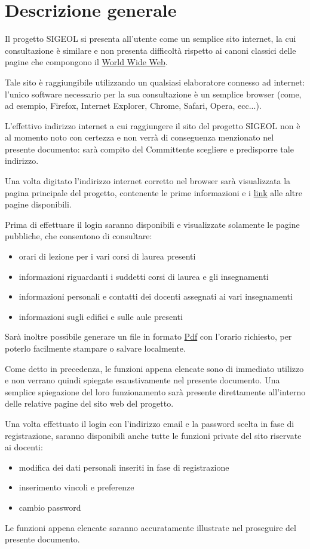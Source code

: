 \documentclass[11pt,a4paper]{article}
\begin{document}
\section{Descrizione generale}
Il progetto SIGEOL si presenta all'utente come un semplice sito internet, la cui consultazione è similare e non presenta difficoltà rispetto ai canoni classici delle pagine che compongono il \underline{World Wide Web}.

Tale sito è raggiungibile utilizzando un qualsiasi elaboratore connesso ad internet: l'unico software necessario per la sua consultazione è un semplice browser (come, ad esempio, Firefox, Internet Explorer, Chrome, Safari, Opera, ecc...).

L'effettivo indirizzo internet a cui raggiungere il sito del progetto SIGEOL non è al momento noto con certezza e non verrà di conseguenza menzionato nel presente documento: sarà compito del Committente scegliere e predisporre tale indirizzo.

Una volta digitato l'indirizzo internet corretto nel browser sarà visualizzata la pagina principale del progetto, contenente le prime informazioni e i \underline{link} alle altre pagine disponibili.

Prima di effettuare il login saranno disponibili e visualizzate solamente le pagine pubbliche, che consentono di consultare:
\begin{itemize}
 \item orari di lezione per i vari corsi di laurea presenti
 \item informazioni riguardanti i suddetti corsi di laurea e gli insegnamenti
 \item informazioni personali e contatti dei docenti assegnati ai vari insegnamenti
 \item informazioni sugli edifici e sulle aule presenti
\end{itemize}
Sarà inoltre possibile generare un file in formato \underline{Pdf} con l'orario richiesto, per poterlo facilmente stampare o salvare localmente.

Come detto in precedenza, le funzioni appena elencate sono di immediato utilizzo e non verrano quindi spiegate esaustivamente nel presente documento.
Una semplice spiegazione del loro funzionamento sarà presente direttamente all'interno delle relative pagine del sito web del progetto.

\bigskip
Una volta effettuato il login con l'indirizzo email e la password scelta in fase di registrazione, saranno disponibili anche tutte le funzioni private del sito riservate ai docenti:
\begin{itemize}
 \item modifica dei dati personali inseriti in fase di registrazione
 \item inserimento vincoli e preferenze
 \item cambio password
\end{itemize}
Le funzioni appena elencate saranno accuratamente illustrate nel proseguire del presente documento.
\end{document}

